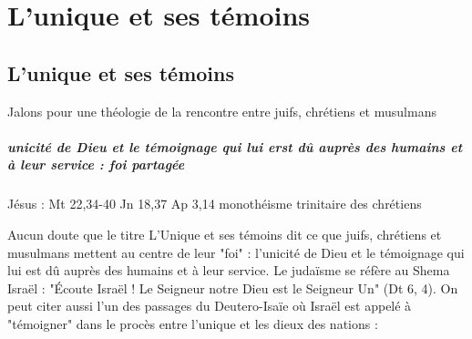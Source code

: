 \chapter{L'unique et ses témoins }



\section{L'unique et ses témoins }

\cite{theobald_christianisme_2007} Jalons pour une théologie de la rencontre entre juifs, chrétiens et musulmans



 
\paragraph{unicité de Dieu et le témoignage qui lui erst dû auprès des humains et à leur service : foi partagée}

Jésus : Mt 22,34-40
Jn 18,37
Ap 3,14 monothéisme trinitaire des chrétiens




Aucun doute que le titre L'Unique et ses témoins dit ce que juifs, chrétiens et musulmans mettent au centre de leur "foi" : l'unicité de Dieu et le témoignage qui lui est dû auprès des humains et à leur service. Le judaïsme se réfère au Shema Israël : "Écoute Israël ! Le Seigneur notre Dieu est le Seigneur Un" (Dt 6, 4). On peut citer aussi l'un des passages du Deutero-Isaïe où Israël est appelé à "témoigner" dans le procès entre l'unique et les dieux des nations :

